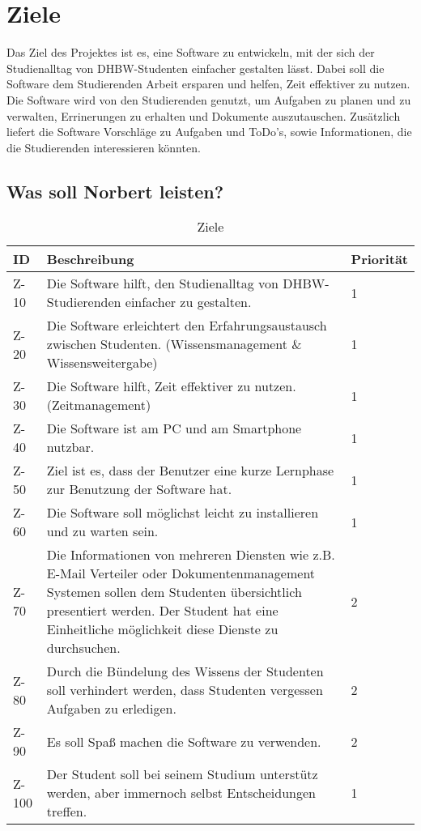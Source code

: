 
\chapter{Ziele}
Das Ziel des Projektes ist es, eine Software zu entwickeln, mit der sich der Studienalltag von DHBW-Studenten einfacher gestalten lässt. Dabei soll die Software dem Studierenden Arbeit ersparen und helfen, Zeit effektiver zu nutzen. Die Software wird von den Studierenden genutzt, um  Aufgaben zu planen und zu verwalten, Errinerungen zu erhalten und Dokumente auszutauschen. Zusätzlich liefert die Software Vorschläge zu Aufgaben und ToDo's, sowie Informationen, die die Studierenden interessieren könnten. 

\section{Was soll Norbert leisten?}
\begin{table}[H]
\caption{Ziele}
\label{ziele:entwicklungsziele}
\begin{tabularx}{\textwidth}{|l|X|l|}
\toprule
\textbf{ID} & \textbf{Beschreibung} & \textbf{Priorität}\\
\endhead
\hline
Z-10 & Die Software hilft, den Studienalltag von DHBW-Studierenden einfacher zu gestalten. & 1 \\
Z-20 & Die Software erleichtert den Erfahrungsaustausch zwischen Studenten. (Wissensmanagement \& Wissensweitergabe) & 1 \\
Z-30 & Die Software hilft, Zeit effektiver zu nutzen. (Zeitmanagement) & 1\\
Z-40 & Die Software ist am PC und am Smartphone nutzbar. & 1\\
Z-50 & Ziel ist es, dass der Benutzer eine kurze Lernphase zur Benutzung der Software hat. & 1 \\
Z-60 & Die Software soll möglichst leicht zu installieren und zu warten sein. & 1 \\
Z-70 & Die Informationen von mehreren Diensten wie z.B. E-Mail Verteiler oder Dokumentenmanagement Systemen sollen dem Studenten übersichtlich presentiert werden. Der Student hat eine Einheitliche möglichkeit diese Dienste zu durchsuchen. & 2 \\
Z-80 & Durch die Bündelung des Wissens der Studenten soll verhindert werden, dass Studenten vergessen Aufgaben zu erledigen. & 2 \\
Z-90 & Es soll Spaß machen die Software zu verwenden. & 2 \\
Z-100 & Der Student soll bei seinem Studium unterstütz werden, aber immernoch selbst Entscheidungen treffen. & 1 \\
\hline
\end{tabularx}
\end{table}

